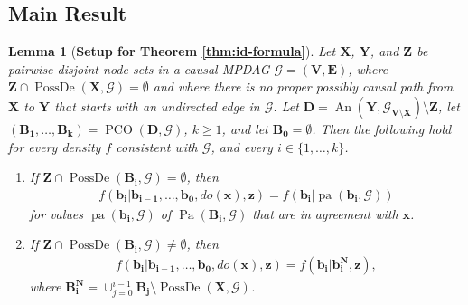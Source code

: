 \documentclass[11pt]{article}
\DeclareMathOperator{\An}{An}
\DeclareMathOperator{\Pa}{Pa}
\DeclareMathOperator{\pa}{pa}
\DeclareMathOperator{\PossDe}{PossDe}
\DeclareMathOperator{\PCO}{PCO}
\newtheorem{lemma}[theorem]{Lemma}
\newcommand{\mb}[1]{\mathbf{#1}}
\newcommand{\g}[1][G]{\mathcal{#1}}
\begin{document}

\subsection{Main Result}

\begin{lemma}[\textbf{Setup for Theorem \ref{thm:id-formula}}]
\label{lem:algo-4} 
    Let $\mb{X}$, $\mb{Y}$, and $\mb{Z}$ be pairwise disjoint node sets in a causal MPDAG $\g =(\mb{V,E})$, where $\mb{Z} \cap \PossDe(\mb{X},\g) = \emptyset$ and where there is no proper possibly causal path from $\mb{X}$ to $\mb{Y}$ that starts with an undirected edge in $\g$. Let $\mb{D} =\An(\mb{Y},\g_{\mb{V} \setminus \mb{X}}) \setminus \mb{Z}$, let $(\mb{B_1}, \dots, \mb{B_k}) = \PCO(\mb{D},\g)$, $k \ge 1$, and let $\mb{B_0} = \emptyset$. Then the following hold for every density $f$ consistent with $\g$, and every $i \in \{1, \dots, k\}$.
    
    \begin{enumerate}[label=(\roman*)]
        \item \label{lem:algo-4-one} 
        If $\mb{Z} \cap \PossDe(\mb{B_i}, \g) = \emptyset$, then
        \begin{align}
            f(\mb{b_i}| \mb{b_{i-1}}, \dots, \mb{b_0}, do(\mb{x}),\mb{z}) = f(\mb{b_i}|\pa(\mb{b_i},\g))
        \end{align}
        for values $\pa(\mb{b_i},\g)$ of $\Pa(\mb{B_i},\g)$ that are in agreement with $\mb{x}$.
        
        \item \label{lem:algo-4-two}
        If $\mb{Z} \cap \PossDe(\mb{B_i}, \g) \neq \emptyset$, then
        \begin{align}
            f(\mb{b_i}| \mb{b_{i-1}}, \dots, \mb{b_0}, do(\mb{x}), \mb{z}) = f(\mb{b_i}| \mb{b_i^N}, \mb{z}),
        \end{align}
        where $\mb{B_i^N}= \cup_{j=0}^{i-1}\mb{B_j} \setminus \PossDe(\mb{X},\g)$.
    \end{enumerate}
\end{lemma}
\end{document}
